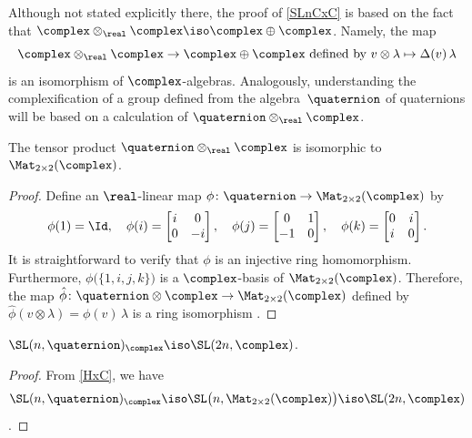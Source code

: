 Although not stated explicitly there, the proof of
\cref{SLnCxC} is based on the fact that $\complex
\otimes_{\real} \complex \iso \complex \oplus \complex$.
Namely, the map
 $$ \mbox{$\complex \otimes_{\real} \complex \to \complex
\oplus \complex$
 defined by $v \otimes \lambda \mapsto \Delta(v) \, \lambda$} $$
 is an isomorphism of $\complex$-algebras. Analogously, understanding the complexification of a group defined from the algebra~$\quaternion$ of quaternions will be
based on a calculation of $\quaternion \otimes_{\real}
\complex$.

\begin{lem} \label{HxC}
 The tensor product $\quaternion \otimes_{\real}
\complex$ is isomorphic to $\Mat_{2 \times 2}(\complex)$.
 \end{lem}

\begin{proof}
  Define an $\real$-linear map $\phi \colon \quaternion \to
\Mat_{2 \times 2}(\complex)$ by
 $$ \phi(1) = \Id, 
 \quad \phi(i)
 = \begin{bmatrix}
 i & 0 \\
 0 & -i
 \end{bmatrix}
 ,
 \quad \phi(j)
 = \begin{bmatrix}
 0 & 1 \\
 -1 & 0
 \end{bmatrix}
 ,
 \quad \phi(k)
 = \begin{bmatrix}
 0 & i \\
 i & 0
 \end{bmatrix}
 .
 $$
 It is straightforward to verify that $\phi$ is an injective
ring homomorphism. Furthermore, $\phi \bigl( \{1,i,j,k\}
\bigr)$ is a $\complex$-basis of $\Mat_{2 \times
2}(\complex)$. Therefore, the map $\hat\phi \colon
\quaternion \otimes \complex \to \Mat_{2 \times
2}(\complex)$ defined by $\hat{\phi}(v \otimes \lambda) = \phi(v)
\, \lambda$ is a ring isomorphism .
 \end{proof}

\begin{prop} \label{SLnHxC}
 $\SL(n,\quaternion)_{\complex} \iso \SL(2n,\complex)$.
 \end{prop}

\begin{proof}
 From \cref{HxC}, we have
 $$ \SL(n,\quaternion)_{\complex}
 \iso \SL \bigl( n, \Mat_{2 \times 2}(\complex) \bigr)
 \iso \SL(2n,\complex) $$
 .
 \end{proof}

